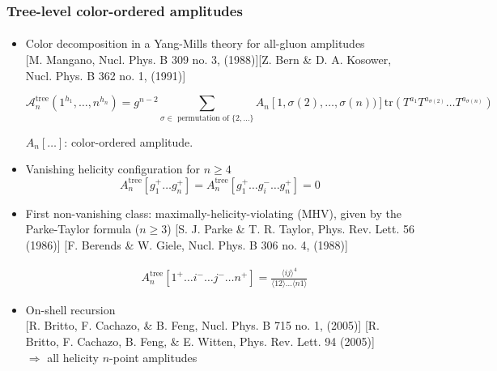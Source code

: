 \documentclass[english]{beamer}
\newcommand{\tr}{\mathrm{tr}}
\begin{document}
\begin{frame}[shrink=30]
\frametitle{Tree-level color-ordered amplitudes}
\framesubtitle{}
\begin{itemize}
\item<1-> Color decomposition in a Yang-Mills theory for all-gluon amplitudes
\\
\tiny\color{blue}[M. Mangano, Nucl. Phys. B 309
no. 3, (1988)][Z. Bern \& D. A. Kosower, Nucl. Phys. B 362 no. 1, (1991)]\color{black}\normalsize

\small
\begin{equation*}
\mathcal{A}_n^{\mathrm{tree}}(1^{h_1}, \ldots, n^{h_n}) = g^{n-2}\sum_{\sigma\in\textrm{ permutation of }\{2,\ldots\}} A_n[1,\sigma(2),\ldots,\sigma(n))]\tr(T^{a_1} T^{a_{\sigma(2)}}\ldots T^{a_{\sigma(n)}})
\end{equation*}
\normalsize

$A_n[\ldots]$: color-ordered amplitude. 


\item<2-> Vanishing helicity configuration for $n\geq 4$
\begin{equation*}
A^{\mathrm{tree}}_n[g_1^+ \ldots g_n^+] = A^{\mathrm{tree}}_n[g_1^+ \ldots g_i^- \ldots g_n^+] = 0
\end{equation*}

\item<3-> First non-vanishing class: maximally-helicity-violating (MHV), given by the Parke-Taylor formula ($n\geq 3$)
\tiny\color{blue}[S. J. Parke \& T. R. Taylor, Phys. Rev. Lett.
56 (1986)]
[F. Berends \& W. Giele, Nucl. Phys. B 306 no. 4, (1988)]
\color{black}\normalsize


\begin{equation*}
\begin{split}
& A^{\mathrm{tree}}_n[1^+\ldots i^-\ldots j^-\ldots n^+] = 
\frac{\langle ij \rangle^4}{\langle 12 \rangle\ldots \langle n1 \rangle}
\end{split}
\end{equation*}

\item<4-> On-shell recursion 
\\
\tiny\color{blue}
[R. Britto, F. Cachazo, \& B. Feng, Nucl. Phys. B 715 no. 1, (2005)] 
[R. Britto, F. Cachazo, B. Feng, \& E. Witten, Phys. Rev. Lett. 94
(2005)]\color{black}\normalsize
\\
 $\Rightarrow$ all helicity $n$-point amplitudes

\end{itemize}
\end{frame}
\end{document}
